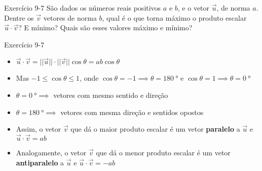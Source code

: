 \begin{frame}[c]{Exercício 9-7}
    São dados os números reais positivos \(a\) e \(b\), e o vetor \(\vec{u}\), de norma \(a\).
    Dentre os \(\vec{v}\) vetores de norma \(b\), qual é o que torna máximo o produto escalar \(\vec{u}\cdot\vec{v}\)?
    E mínimo? Quais são esses valores máximo e mínimo?
\end{frame}

\begin{frame}{Exercício 9-7}
    \begin{itemize}
        \item \(
            \vec{u}\cdot\vec{v}=||\vec{u}||\cdot ||\vec{v}||\cos{\theta}=
            ab\cos{\theta}
            \)
        \item Mas \(-1 \leq \cos{\theta} \leq 1\), onde \(
            \cos{\theta}=-1 \implies\theta=\SI{180}{\degree}\) e \(
            \cos{\theta}=1 \implies\theta=\SI{0}{\degree}\)
        \item \(\theta=\SI{0}{\degree} \implies \) vetores com mesmo sentido e direção
        \item \(\theta=\SI{180}{\degree} \implies \) vetores com mesma direção e sentidos opostos
        \item Assim, o vetor \(\vec{v}\) que dá o maior produto escalar é um vetor \textbf{paralelo} a \(\vec{u}\)
            e \( \vec{u}\cdot\vec{v}=ab\)

        \item Analogamente, o vetor \(\vec{v}\) que dá o menor produto escalar é um vetor \textbf{antiparalelo} a \(\vec{u}\)
            e \( \vec{u}\cdot\vec{v}=-ab\)
    \end{itemize}

\end{frame}

